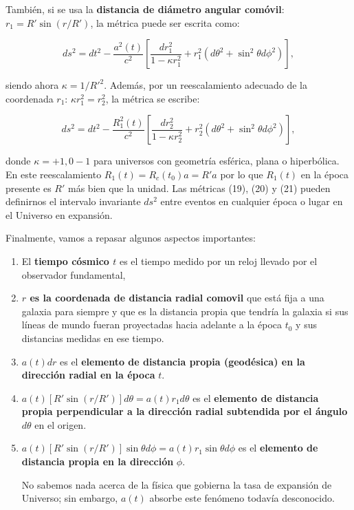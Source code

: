 \documentclass{article}
\begin{document}
También, si se usa la {\bf{distancia de diámetro angular comóvil}}: $r_1 = R' \sin(r/R')$, la métrica puede ser escrita como:

    \begin{equation}
        ds^2 = dt^2 - \frac{a^2(t)}{c^2} \left[ \frac{dr_1^2}{1 - \kappa r_1^2} + r_1^2 (d\theta^2 + \sin^2 \theta d\phi^2) \right],
    \end{equation}

    siendo ahora $\kappa = 1/R'^2$. Además, por un reescalamiento adecuado de la coordenada $r_1$: $\kappa r_1^2=r_2^2$, la métrica se escribe:

    \begin{equation}
        ds^2 = dt^2 - \frac{R_1^2(t)}{c^2} \left[ \frac{dr_2^2}{1 - \kappa r_2^2} + r_2^2 (d\theta^2 + \sin^2 \theta d\phi^2) \right],
    \end{equation}

donde $\kappa = +1, 0 -1$ para universos con geometría esférica, plana o hiperbólica. En este reescalamiento $R_1(t)= R_c(t_0) a= R'a$ por lo que $R_1(t)$ en la época presente es $R'$ más bien que la unidad. 
Las métricas (19), (20) y (21) pueden definirnos el intervalo invariante $ds^2$ entre eventos en cualquier época o lugar en el Universo en expansión. 

Finalmente, vamos a repasar algunos aspectos importantes:

    \begin{enumerate}

        \item El {\bf{tiempo cósmico $t$}} es el tiempo medido por un reloj llevado por el observador fundamental,
        \item {\bf{$r$ es la coordenada de distancia radial comovil}} que está fija a una galaxia para siempre y que es la distancia propia que tendría la galaxia si sus líneas de mundo fueran proyectadas hacia adelante a la época $t_0$ y sus distancias medidas en ese tiempo. 
        \item $a(t)dr$ es el {\bf{elemento de distancia propia (geodésica) en la dirección radial en la época}} $t$. 
        \item $a(t) [R'\sin(r/R')] d\theta = a(t) r_1 d\theta$ es el {\bf{elemento de distancia propia perpendicular a la dirección radial subtendida por el ángulo}} $d\theta$ en el origen. 
        \item $a(t) [R'\sin(r/R')] \sin \theta d\phi = a(t) r_1 \sin \theta d\phi$ es el {\bf{elemento de distancia propia en la dirección}} $\phi$.
        
        No sabemos nada acerca de la física que gobierna la tasa de expansión de Universo; sin embargo, $a(t)$ absorbe este fenómeno todavía desconocido.  
        
    \end{enumerate} 
\end{document}
